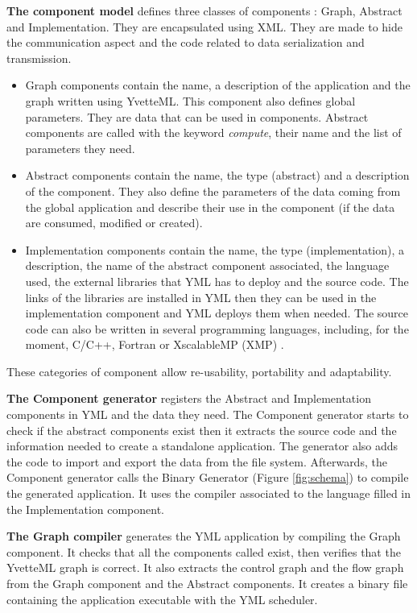 \textbf{The component model} defines three classes of components : Graph, Abstract and Implementation.
They are encapsulated using XML.
They are made to hide the communication aspect and the code related to data serialization and transmission.

\begin{itemize}
	\item Graph components contain the name, a description of the application and the graph written using YvetteML.
	This component also defines global parameters.
	They are data that can be used in components.
	Abstract components are called with the keyword \textit{compute}, their name and the list of parameters they need.
	\item Abstract components contain the name, the type (abstract) and a description of the component.
	They also define the parameters of the data coming from the global application and describe their use in the component (if the data are consumed, modified or created).
	\item Implementation components contain the name, the type (implementation), a description, the name of the abstract component associated, the language used, the external libraries that YML has to deploy and the source code.
	The links of the libraries are installed in YML then they can be used in the implementation component and YML deploys them when needed.
	The source code can also be written in several programming languages, including, for the moment, C/C++, Fortran or XscalableMP (XMP) \cite{XMP}.
\end{itemize}

These categories of component allow re-usability, portability and adaptability.

\textbf{The Component generator} registers the Abstract and Implementation components in YML and the data they need.
The Component generator starts to check if the abstract components exist then it extracts the source code and the information needed to create a standalone application.
The generator also adds the code to import and export the data from the file system.
Afterwards, the Component generator calls the Binary Generator (Figure \ref{fig:schema}) to compile the generated application.
It uses the compiler associated to the language filled in the Implementation component.

\textbf{The Graph compiler} generates the YML application by compiling the Graph component.
It checks that all the components called exist, then verifies that the YvetteML graph is correct.
It also extracts the control graph and the flow graph from the Graph component and the Abstract components.
It creates a binary file containing the application executable with the YML scheduler.

